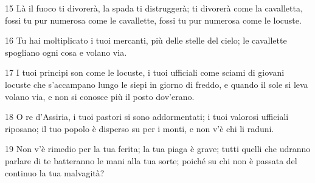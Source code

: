 \par 15 Là il fuoco ti divorerà, la spada ti distruggerà; ti divorerà come la cavalletta, fossi tu pur numerosa come le cavallette, fossi tu pur numerosa come le locuste.
\par 16 Tu hai moltiplicato i tuoi mercanti, più delle stelle del cielo; le cavallette spogliano ogni cosa e volano via.
\par 17 I tuoi principi son come le locuste, i tuoi ufficiali come sciami di giovani locuste che s'accampano lungo le siepi in giorno di freddo, e quando il sole si leva volano via, e non si conosce più il posto dov'erano.
\par 18 O re d'Assiria, i tuoi pastori si sono addormentati; i tuoi valorosi ufficiali riposano; il tuo popolo è disperso su per i monti, e non v'è chi li raduni.
\par 19 Non v'è rimedio per la tua ferita; la tua piaga è grave; tutti quelli che udranno parlare di te batteranno le mani alla tua sorte; poiché su chi non è passata del continuo la tua malvagità?


